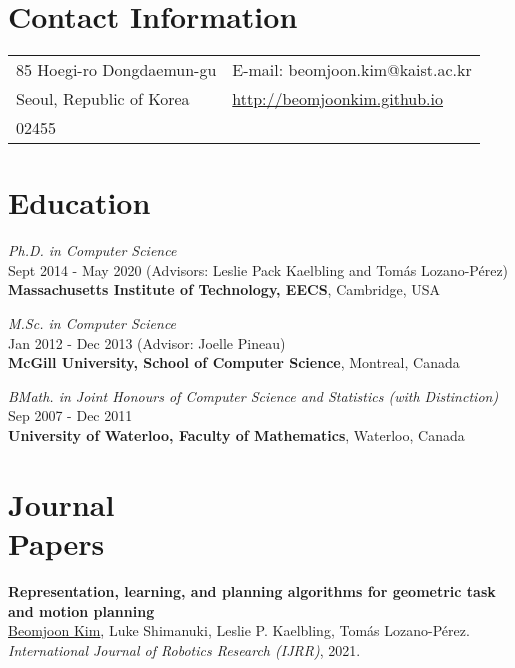 \documentclass[line,margin,letterpaper]{res}
\begin{document}
\newcommand{\sth}[0]{$^{\textrm{th}}$ }



\begin{resume}
\section{Contact Information}
\hspace{-10px}
\begin{tabular}{ll}
85 Hoegi-ro Dongdaemun-gu & E-mail: beomjoon.kim@kaist.ac.kr\\
Seoul, Republic of Korea& \small{\url{http://beomjoonkim.github.io}}\\
02455 & \\
\end{tabular}


\section{Education}
{\sl Ph.D. in Computer Science} \\Sept 2014 - May 2020 (Advisors: Leslie Pack Kaelbling
and Tom\'as Lozano-P\'erez)\\
\textbf{Massachusetts Institute of Technology, EECS}, Cambridge, USA


{\sl M.Sc. in Computer Science} \\Jan 2012 - Dec 2013 (Advisor: Joelle Pineau)\\
\textbf{McGill University, School of Computer Science}, Montreal, Canada

{\sl BMath. in Joint Honours of Computer Science and Statistics (with Distinction)} \\Sep 2007 - Dec 2011\\
\textbf{University of Waterloo, Faculty of Mathematics}, Waterloo, Canada

\section{Journal\\ Papers}
\textbf{Representation, learning, and planning algorithms for geometric task and motion planning}\\
\underline{Beomjoon Kim}, Luke Shimanuki, Leslie P. Kaelbling, Tom\'as Lozano-P\'erez.\\
{\sl International Journal of Robotics Research (IJRR)}, 2021.


\end{resume}
\end{document}
